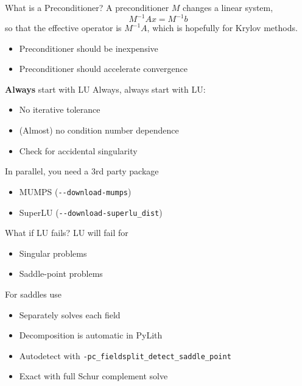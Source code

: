 \documentclass[dvipsnames]{beamer}
\begin{document}
%
\begin{frame}{What is a Preconditioner?}\Large
A preconditioner $M$ changes a linear system,
\begin{equation*}
  M^{-1} A x = M^{-1} b
\end{equation*}
so that the effective operator is $M^{-1} A$, which is hopefully  for Krylov methods.
\bigskip
\begin{itemize}
  \item<2-> Preconditioner should be inexpensive
  \medskip
  \item<3-> Preconditioner should accelerate convergence
\end{itemize}
\end{frame}
%
\begin{frame}[fragile]{{\bf Always} start with LU}
Always, always start with LU:
\begin{itemize}
  \item No iterative tolerance
  \medskip
  \item (Almost) no condition number dependence
  \medskip
  \item Check for accidental singularity
\end{itemize}
\pause
\bigskip
In parallel, you need a 3rd party package
\begin{itemize}
  \item MUMPS (\verb|--download-mumps|)
  \medskip
  \item SuperLU (\verb|--download-superlu_dist|)
\end{itemize}
\end{frame}
\begin{frame}[fragile]{What if LU fails?}\Large
LU will fail for
\begin{itemize}
  \item Singular problems
  \medskip
  \item Saddle-point problems
\end{itemize}
\pause
\smallskip
For saddles use 
\begin{itemize}
  \item Separately solves each field
  \medskip
  \item Decomposition is automatic in PyLith
  \medskip
  \item Autodetect with {\small \verb|-pc_fieldsplit_detect_saddle_point|}
  \medskip
  \item Exact with full Schur complement solve
\end{itemize}
\end{frame}
%
%
\end{document}
